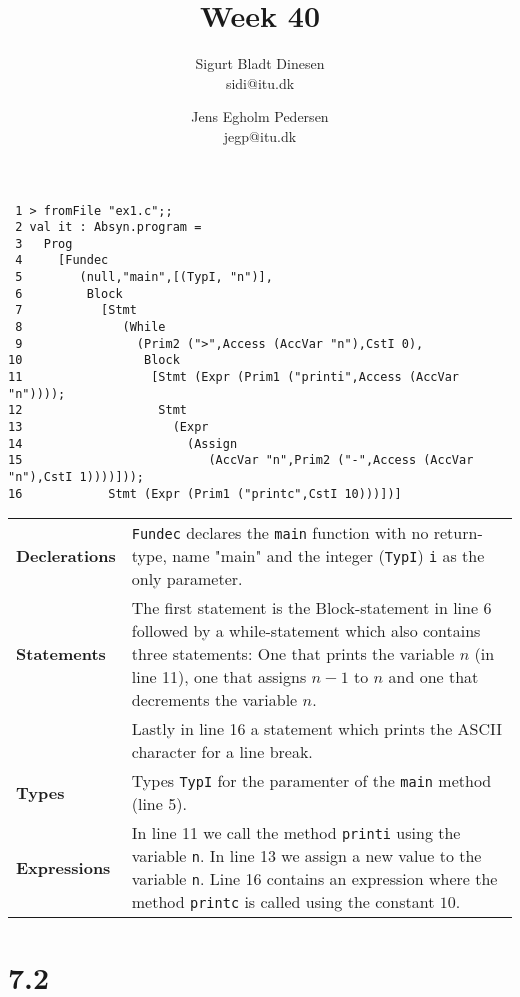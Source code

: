 \documentclass[a4paper, titlepage]{article}
\begin{document}
\title{Week 40}
\author{Sigurt Bladt Dinesen \\sidi{@}itu.dk \and Jens Egholm Pedersen \\jegp{@}itu.dk}
\maketitle
\begin{verbatim}
 1 > fromFile "ex1.c";;
 2 val it : Absyn.program =
 3   Prog
 4     [Fundec
 5        (null,"main",[(TypI, "n")],
 6         Block
 7           [Stmt
 8              (While
 9                (Prim2 (">",Access (AccVar "n"),CstI 0),
10                 Block
11                  [Stmt (Expr (Prim1 ("printi",Access (AccVar "n"))));
12                   Stmt
13                     (Expr
14                       (Assign
15                          (AccVar "n",Prim2 ("-",Access (AccVar "n"),CstI 1))))]));
16            Stmt (Expr (Prim1 ("printc",CstI 10)))])]
\end{verbatim}

\quad

\begin{tabular}{l p{12cm}}
  \textbf{Declerations} & \texttt{Fundec} declares the \texttt{main} 
  function with no return-type, name "main" and the integer 
  (\texttt{TypI}) \texttt{i} as the only parameter. \\
  \textbf{Statements} & The first statement is the Block-statement 
  in line 6 followed by a while-statement which also contains three
  statements: One that prints the variable $n$ (in line 11), 
  one that assigns $n - 1$ to $n$ and one that decrements the 
  variable $n$. \\
  & Lastly in line 16 a statement which prints the ASCII character 
  for a line break. \\
  \textbf{Types} & Types \texttt{TypI} for the paramenter of the 
  \texttt{main} method (line 5). \\
  \textbf{Expressions} & In line 11 we call the method 
  \texttt{printi} using the variable \texttt{n}. In line 13 we assign 
  a new value to the variable \texttt{n}. Line 16 contains an 
  expression where the method \texttt{printc} is called using the 
  constant $10$.
\end{tabular}

\section*{7.2}
\end{document}
